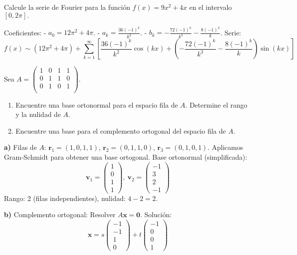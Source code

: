 \begin{prob}
Calcule la serie de Fourier para la función $f(x)=9x^2+4x$ en el intervalo $\left[0,2\pi\right].$
\begin{myproof}
Coeficientes:  
- \( a_0 = 12\pi^2 + 4\pi \).  
- \( a_k = \frac{36(-1)^k}{k^2} \).  
- \( b_k = -\frac{72(-1)^k}{k^3} - \frac{8(-1)^k}{k} \).  
Serie:  
\[
\boxed{f(x) \sim (12\pi^2 + 4\pi) + \sum_{k=1}^{\infty} \left[ \frac{36(-1)^k}{k^2} \cos(kx) + \left( -\frac{72(-1)^k}{k^3} - \frac{8(-1)^k}{k} \right) \sin(kx) \right]}
\]
\end{myproof}
\end{prob}

\begin{prob}
Sea $A=\left( \begin{array}{cccc} 
	1&0&1&1\\
	0&1&1&0\\
	0&1&0&1\\
	\end{array} \right).$ 
	\begin{enumerate}
	\item Encuentre una base ortonormal para el espacio fila de $A.$ Determine el rango y la nulidad de $A.$
	\item Encuentre una base para el complemento ortogonal del espacio fila de $A.$
	\end{enumerate}
\begin{myproof}
\textbf{a)} Filas de \( A \): \( \mathbf{r}_1 = (1,0,1,1) \), \( \mathbf{r}_2 = (0,1,1,0) \), \( \mathbf{r}_3 = (0,1,0,1) \).  
Aplicamos Gram-Schmidt para obtener una base ortogonal.  
Base ortonormal (simplificada):  
\[
\boxed{\mathbf{v}_1 = \begin{pmatrix} 1 \\ 0 \\ 1 \\ 1 \end{pmatrix},\ \mathbf{v}_2 = \begin{pmatrix} -1 \\ 3 \\ 2 \\ -1 \end{pmatrix}}
\]
Rango: 2 (filas independientes), nulidad: \( 4 - 2 = 2 \).

\textbf{b)} Complemento ortogonal: Resolver \( A\mathbf{x} = \mathbf{0} \).  
Solución:
\[
\boxed{\mathbf{x} = s \begin{pmatrix} -1 \\ -1 \\ 1 \\ 0 \end{pmatrix} + t \begin{pmatrix} -1 \\ 0 \\ 0 \\ 1 \end{pmatrix}}
\]
\end{myproof}
\end{prob}



